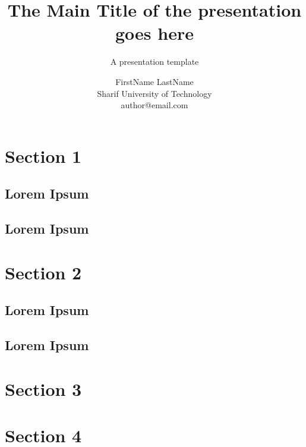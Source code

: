 \documentclass[UKenglish, aspectratio = 169]{beamer}
\author[Author Name]
{FirstName LastName\\Sharif University of Technology\\author@email.com}
\title{The Main Title of the presentation \\goes here}
\subtitle{A presentation template}
\begin{document}
     \begin{frame}[allowframebreaks]
    \tableofcontents
\end{frame}

\section{Section 1}
	\subsection{Lorem Ipsum}
	\subsection{Lorem Ipsum}
\section{Section 2}
	\subsection{Lorem Ipsum}
	\subsection{Lorem Ipsum}
\section{Section 3}
\section{Section 4}
	
\end{document}
